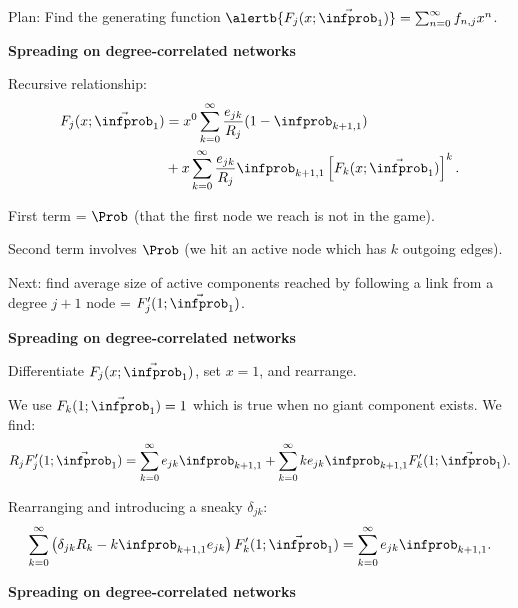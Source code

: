     \alert{Plan:} Find the generating function
    $\alertb{F_j(x;\vec{\infprob}_1)} = \sum_{n=0}^\infty f_{n,j} x^n$.
  


  \textbf{Spreading on degree-correlated networks}

  
   Recursive relationship:
    \begin{align}
      \nonumber
      F_j(x;\vec{\infprob}_1)
      & =
      x^{0}
      \sum_{k=0}^{\infty} 
      \frac{e_{jk}}{R_j}
      ( 1 - \infprob_{k+1,1} )
      \\ 
      \nonumber
      & +
      x
      \sum_{k=0}^{\infty} 
      \frac{e_{jk}}{R_j}
      \infprob_{k+1,1}
      \left[
        F_k(x;\vec{\infprob}_1)
      \right]^k.
    \end{align}
  
    \alert{First term} =
    $\Prob$ (that the first node we reach is not in the game).
  
    \alert{Second term} involves
    $\Prob$ (we hit an active node which has $k$ outgoing edges).
  
    Next: find average size of active components reached
    by following a link from a degree $j+1$ node = $F_{j}'(1;\vec{\infprob}_1)$.
  



  \textbf{Spreading on degree-correlated networks}

  
  
    Differentiate $F_{j}(x;\vec{\infprob}_1)$,
    set $x=1$, and rearrange.
  
    We use $F_k(1;\vec{\infprob}_1)=1$ which
    is true when no giant component exists.
    {We find:}
    {
      $$
      R_j F_{j}'(1;\vec{\infprob}_1)
      =
      \sum_{k=0}^{\infty}
      e_{jk}
      \infprob_{k+1,1}
      + 
      \sum_{k=0}^{\infty}
      k e_{jk}
      \infprob_{k+1,1}
      F_k'(1;\vec{\infprob}_1).
      $$
    }
    
      Rearranging and introducing a sneaky $\delta_{jk}$:
      $$
      \sum_{k=0}^\infty
      \left(
        \delta_{jk} R_k 
        -
        k \infprob_{k+1,1} e_{jk}
      \right)
      F_k'(1;\vec{\infprob}_1)
      =
      \sum_{k=0}^{\infty}
      e_{jk}
      \infprob_{k+1,1}.
      $$
  
  


  \textbf{Spreading on degree-correlated networks}

  
  
